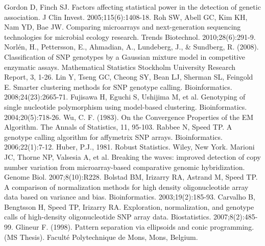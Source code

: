 \documentclass{scrartcl}
\begin{document}
\begin{thebibliography}{9}
Gordon D, Finch SJ. Factors affecting statistical power in the detection of
genetic association. J Clin Invest. 2005;115(6):1408-18.
Roh SW, Abell GC, Kim KH, Nam YD, Bae JW. Comparing microarrays and
next-generation sequencing technologies for microbial ecology research.
Trends Biotechnol. 2010;28(6):291-9.
Norl\'{e}n, H., Pettersson, E., Ahmadian, A., Lundeberg, J., \& Sundberg, R.
(2008). Classification of SNP genotypes by a Gaussian mixture model in
competitive enzymatic assays.
Mathematical Statistics Stockholm University Research Report, 3, 1-26.
Lin Y, Tseng GC, Cheong SY, Bean LJ, Sherman SL, Feingold E. Smarter
clustering methods for SNP genotype calling.
Bioinformatics. 2008;24(23):2665-71.
Fujisawa H, Eguchi S, Ushijima M, et al. Genotyping of single nucleotide
polymorphism using model-based clustering. Bioinformatics. 2004;20(5):718-26.
Wu, C. F. (1983). On the Convergence Properties of the EM Algorithm.
The Annals of Statistics, 11, 95-103.
Rabbee N, Speed TP. A genotype calling algorithm for affymetrix SNP arrays.
Bioinformatics. 2006;22(1):7-12.
Huber, P.J., 1981. Robust Statistics. Wiley, New York.
Marioni JC, Thorne NP, Valsesia A, et al. Breaking the waves: improved
detection of copy number variation from microarray-based comparative genomic
hybridization. Genome Biol. 2007;8(10):R228.
Bolstad BM, Irizarry RA, Astrand M, Speed TP. A comparison of normalization
methods for high density oligonucleotide array data based on variance and
bias. Bioinformatics. 2003;19(2):185-93.
Carvalho B, Bengtsson H, Speed TP, Irizarry RA. Exploration, normalization,
and genotype calls of high-density oligonucleotide SNP array data.
Biostatistics. 2007;8(2):485-99.
Glineur F. (1998). Pattern separation via ellipsoids and conic programming.
(MS Thesis). Faculté Polytechnique de Mons, Mons, Belgium.
\end{thebibliography}
\end{document}
